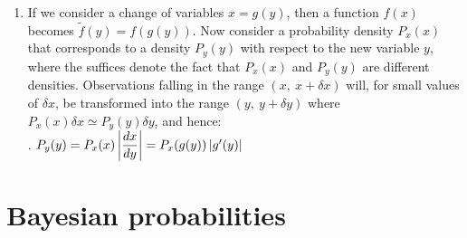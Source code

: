 \begin{enumerate}
    \item If we consider a change of variables $x = g(y)$, then a function $f (x)$ becomes $\tilde{f} (y) = f (g(y))$.
    Now consider a probability density $P_x(x)$ that corresponds to a density $P_y (y)$ with respect to the new variable $y$, where the suffices denote the fact that $P_x(x)$ and $P_y (y)$ are different densities.
    Observations falling in the range $(x,\ x + \delta x)$ will, for small values of $\delta x$, be transformed into the range $(y,\ y + \delta y)$ where $P_x(x)\delta x \simeq P_y (y)\delta y$, and hence:
    \hfill \cite{ml/book/Pattern-Recognition-And-Machine-Learning/Christopher-M-Bishop}
    \\[0.2cm]
    .\hfill
    $
        P_y(y)
        = P_x(x) \left| \dfrac{dx}{dy} \right|
        = P_x(g(y)) \left| g^\prime(y) \right|
    $
    \hfill \cite{ml/book/Pattern-Recognition-And-Machine-Learning/Christopher-M-Bishop}
\end{enumerate}








\section{Bayesian probabilities}

